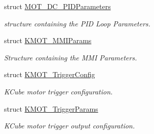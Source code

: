 \begin{DoxyCompactItemize}
struct \hyperlink{struct_m_o_t___d_c___p_i_d_parameters}{M\+O\+T\+\_\+\+D\+C\+\_\+\+P\+I\+D\+Parameters}
\begin{DoxyCompactList}\small\item\em structure containing the P\+ID Loop Parameters. \end{DoxyCompactList}\item 
struct \hyperlink{struct_k_m_o_t___m_m_i_params}{K\+M\+O\+T\+\_\+\+M\+M\+I\+Params}
\begin{DoxyCompactList}\small\item\em Structure containing the M\+MI Parameters. \end{DoxyCompactList}\item 
struct \hyperlink{struct_k_m_o_t___trigger_config}{K\+M\+O\+T\+\_\+\+Trigger\+Config}
\begin{DoxyCompactList}\small\item\em K\+Cube motor trigger configuration. \end{DoxyCompactList}\item 
struct \hyperlink{struct_k_m_o_t___trigger_params}{K\+M\+O\+T\+\_\+\+Trigger\+Params}
\begin{DoxyCompactList}\small\item\em K\+Cube motor trigger output configuration. \end{DoxyCompactList}\end{DoxyCompactItemize}

